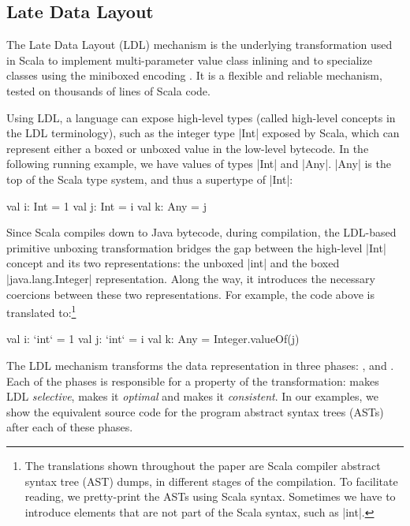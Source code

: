 \subsection{Late Data Layout}

The Late Data Layout (LDL) mechanism \cite{ldl} is the underlying transformation used in Scala to implement multi-parameter value class inlining and to specialize classes using the miniboxed encoding \cite{miniboxing}. It is a flexible and reliable mechanism, tested on thousands of lines of Scala code.

Using LDL, a language can expose high-level types (called high-level concepts in the LDL terminology), such as the integer type |Int| exposed by Scala, which can represent either a boxed or unboxed value in the low-level bytecode. In the following running example, we have values of types |Int| and |Any|. |Any| is the top of the Scala type system, and thus a supertype of |Int|:

\begin{lstlisting-nobreak}
val i: Int = 1
val j: Int = i
val k: Any = j
\end{lstlisting-nobreak}

Since Scala compiles down to Java bytecode, during compilation, the LDL-based primitive unboxing transformation bridges the gap between the high-level |Int| concept and its two representations: the unboxed |int| and the boxed |java.lang.Integer| representation. Along the way, it introduces the necessary coercions between these two representations. For example, the code above is translated to:\footnote{The translations shown throughout the paper are Scala compiler abstract syntax tree (AST) dumps, in different stages of the compilation. To facilitate reading, we pretty-print the ASTs using Scala syntax. Sometimes we have to introduce elements that are not part of the Scala syntax, such as |int|.}

\begin{lstlisting-nobreak}
val i: `int` = 1
val j: `int` = i
val k: Any = Integer.valueOf(j)
\end{lstlisting-nobreak}

The LDL mechanism transforms the data representation in three phases:
\inject{}, \coerce{} and \commit{}. Each of the phases is responsible
for a property of the transformation: \inject{} makes LDL
\emph{selective}, \coerce{} makes it \emph{optimal} and \commit{}
makes it \emph{consistent}. In our examples, we show the equivalent
source code for the program abstract syntax trees (ASTs) after each of
these phases.


